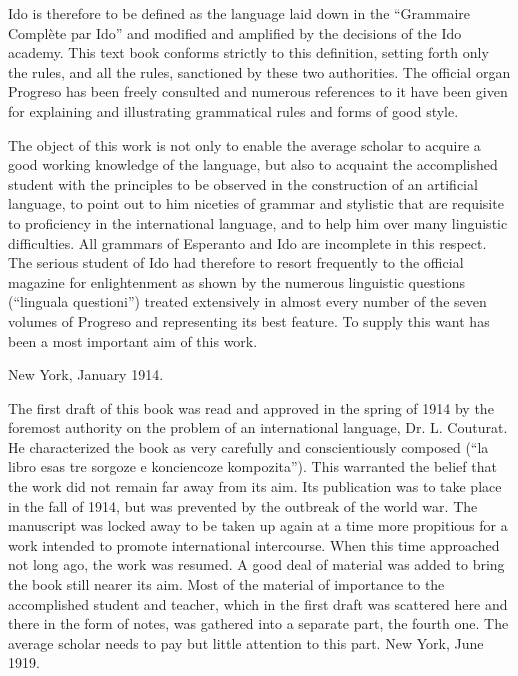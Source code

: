 Ido is therefore to be defined as the language laid down in the “Grammaire Complète par Ido” and modified and amplified by the decisions of the Ido academy. This text book conforms strictly to this definition, setting forth only the rules, and all the rules, sanctioned by these two authorities. The official organ Progreso has been freely consulted and numerous references to it have been given for explaining and illustrating grammatical rules and forms of good style. 

The object of this work is not only to enable the average scholar to acquire a good working knowledge of the language, but also to acquaint the accomplished student with the principles to be observed in the construction of an artificial language, to point out to him niceties of grammar and stylistic that are requisite to proficiency in the international language, and to help him over many linguistic difficulties. All grammars of Esperanto and Ido are incomplete in this respect. The serious student of Ido had therefore to resort frequently to the official magazine for enlightenment as shown by the numerous linguistic questions (“linguala questioni”) treated extensively in almost every number of the seven volumes of Progreso and representing its best feature. To supply this want has been a most important aim of this work. \begin{flushright}New York, January 1914.\end{flushright}

The first draft of this book was read and approved in the spring of 1914 by the foremost authority on the problem of an international language, Dr. L. Couturat. He characterized the book as very carefully and conscientiously composed (“la libro esas tre sorgoze e konciencoze kompozita”). This warranted the belief that the work did not remain far away from its aim. Its publication was to take place in the fall of 1914, but was prevented by the outbreak of the world war. The manuscript was locked away to be taken up again at a time more propitious for a work intended to promote international intercourse. When this time approached not long ago, the work was resumed. A good deal of material was added to bring the book still nearer its aim. Most of the material of importance to the accomplished student and teacher, which in the first draft was scattered here and there in the form of notes, was gathered into a separate part, the fourth one. The average scholar needs to pay but little attention to this part. 
\RaggedLeft New York, June 1919. \justifying